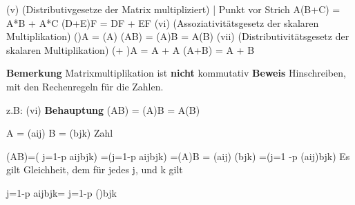 (v) (Distributivgesetze der Matrix multipliziert) | Punkt vor Strich
	A(B+C) = A*B + A*C
	(D+E)F = DF + EF
(vi) (Assoziativitätsgesetz der skalaren Multiplikation)
	(\alpha\beta)A = \alpha(\beta A)
	\alpha(AB) = (\alpha A)B = A(\alpha B)
(vii) (Distributivitätsgesetz der skalaren Multiplikation)
	(\alpha + \beta)A = \alpha A + \beta A
	\alpha(A+B) = \alpha A + \alpha B
	
\textbf{Bemerkung} Matrixmultiplikation ist \textbf{nicht} kommutativ
\textbf{Beweis} Hinschreiben, mit den Rechenregeln für die Zahlen.

z.B: (vi) \textbf{Behauptung} \alpha(AB) = (\alpha A)B = A(\alpha B)

A = (aij) B = (bjk) \alpha Zahl

\alpha(AB)=\alpha( j=1\Summe-p aijbjk)
          =(\alpha j=1\Summe-p aijbjk)
		  =(\alpha A)B = (\alpha*aij) (bjk)
		  =(j=1 \Summe-p (\alpha aij)bjk)
		  Es gilt Gleichheit, dem für jedes j, und k gilt
		
		\alpha j=1\Summe-p aijbjk= j=1\SUmme-p (\alphaaij)bjk